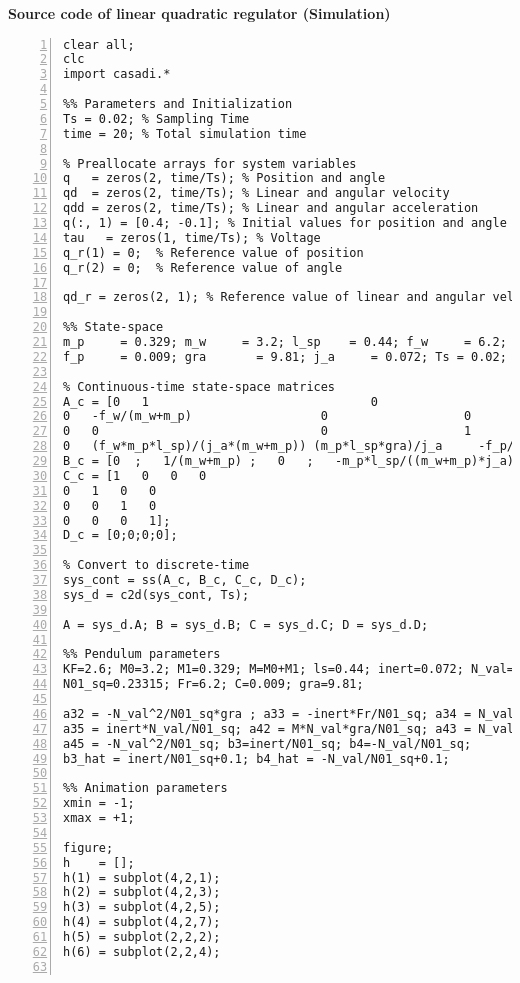 \normalsize\bf{Source code of linear quadratic regulator (Simulation)}
\label{lqrSim.m}
\vspace{1cm}
\begin{lstlisting}[numbers=left,basicstyle=\scriptsize,caption={Source code of linear quadratic regulator (Simulation).},captionpos=b]	
clear all;
clc
import casadi.*

%% Parameters and Initialization
Ts = 0.02; % Sampling Time
time = 20; % Total simulation time

% Preallocate arrays for system variables
q   = zeros(2, time/Ts); % Position and angle
qd  = zeros(2, time/Ts); % Linear and angular velocity
qdd = zeros(2, time/Ts); % Linear and angular acceleration
q(:, 1) = [0.4; -0.1]; % Initial values for position and angle
tau   = zeros(1, time/Ts); % Voltage
q_r(1) = 0;  % Reference value of position
q_r(2) = 0;  % Reference value of angle

qd_r = zeros(2, 1); % Reference value of linear and angular velocity

%% State-space
m_p     = 0.329; m_w     = 3.2; l_sp    = 0.44; f_w     = 6.2; 
f_p     = 0.009; gra       = 9.81; j_a     = 0.072; Ts = 0.02; 

% Continuous-time state-space matrices
A_c = [0   1                               0                   0
0   -f_w/(m_w+m_p)                  0                   0
0   0                               0                   1
0   (f_w*m_p*l_sp)/(j_a*(m_w+m_p)) (m_p*l_sp*gra)/j_a     -f_p/j_a];   
B_c = [0  ;   1/(m_w+m_p) ;   0   ;   -m_p*l_sp/((m_w+m_p)*j_a)];
C_c = [1   0   0   0
0   1   0   0
0   0   1   0
0   0   0   1];
D_c = [0;0;0;0];

% Convert to discrete-time
sys_cont = ss(A_c, B_c, C_c, D_c);
sys_d = c2d(sys_cont, Ts);

A = sys_d.A; B = sys_d.B; C = sys_d.C; D = sys_d.D;

%% Pendulum parameters
KF=2.6; M0=3.2; M1=0.329; M=M0+M1; ls=0.44; inert=0.072; N_val=0.1446;
N01_sq=0.23315; Fr=6.2; C=0.009; gra=9.81;

a32 = -N_val^2/N01_sq*gra ; a33 = -inert*Fr/N01_sq; a34 = N_val*C/N01_sq; 
a35 = inert*N_val/N01_sq; a42 = M*N_val*gra/N01_sq; a43 = N_val*Fr/N01_sq; a44 = -M*C/N01_sq;
a45 = -N_val^2/N01_sq; b3=inert/N01_sq; b4=-N_val/N01_sq;
b3_hat = inert/N01_sq+0.1; b4_hat = -N_val/N01_sq+0.1;

%% Animation parameters
xmin = -1;
xmax = +1;

figure;
h    = [];
h(1) = subplot(4,2,1);
h(2) = subplot(4,2,3);
h(3) = subplot(4,2,5);
h(4) = subplot(4,2,7);
h(5) = subplot(2,2,2);
h(6) = subplot(2,2,4);


\end{lstlisting}
